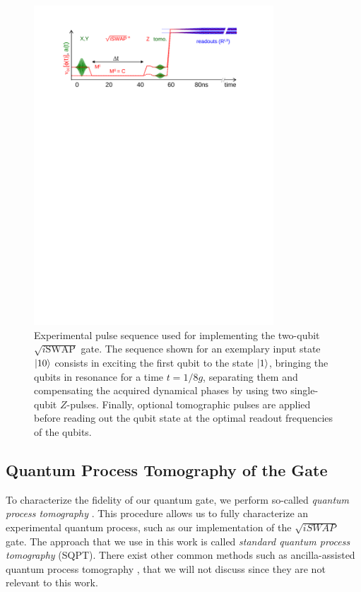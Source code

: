 \begin{figure}[ht!]
	\centering
		\includegraphics[width=0.8\textwidth]{./material/papers/iswap/figures/iswap_gate_pulse_sequence}
	\caption{Experimental pulse sequence used for implementing the two-qubit $\sqrt{i\mathrm{SWAP}}$ gate. The sequence shown for an exemplary input state $\left| 10 \right>$ consists in exciting the first qubit to the state $\left| 1 \right>$, bringing the qubits in resonance for a time $t=1/8g$, separating them and compensating the acquired dynamical phases by using two single-qubit $Z$-pulses. Finally, optional tomographic pulses are applied before reading out the qubit state at the optimal readout frequencies of the qubits.}
	\label{fig:iswap_pulse_sequence}
\end{figure}


\subsection{Quantum Process Tomography of the Gate}

To characterize the fidelity of our quantum gate, we perform so-called {\it quantum process tomography} \citep{poyatos_complete_1997}. This procedure allows us to fully characterize an experimental quantum process, such as our implementation of the $\sqrt{iSWAP}$ gate. The approach that we use in this work is called {\it standard quantum process tomography} (SQPT). There exist other common methods such as ancilla-assisted quantum process tomography \citep{dur_nonlocal_2001,dariano_quantum_2001,altepeter_ancilla-assisted_2003}, that we will not discuss since they are not relevant to this work.

